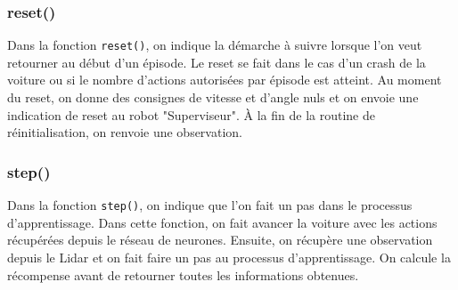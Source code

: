 \documentclass[french]{article}
\begin{document}
\subsubsection*{reset()}
Dans la fonction \texttt{reset()}, on indique la démarche à suivre lorsque l'on veut retourner au début d'un épisode. 
Le reset se fait dans le cas d'un crash de la voiture ou si le nombre d'actions autorisées par épisode est atteint. 
Au moment du reset, on donne des consignes de vitesse et d'angle nuls et on envoie une indication de reset au robot 
"Superviseur". À la fin de la routine de réinitialisation, on renvoie une observation.

\subsubsection*{step()}
Dans la fonction \texttt{step()}, on indique que l'on fait un pas dans le processus d'apprentissage. Dans cette 
fonction, on fait avancer la voiture avec les actions récupérées depuis le réseau de neurones. Ensuite, on récupère 
une observation depuis le Lidar et on fait faire un pas au processus d'apprentissage. On calcule la récompense 
avant de retourner toutes les informations obtenues.
\end{document}
